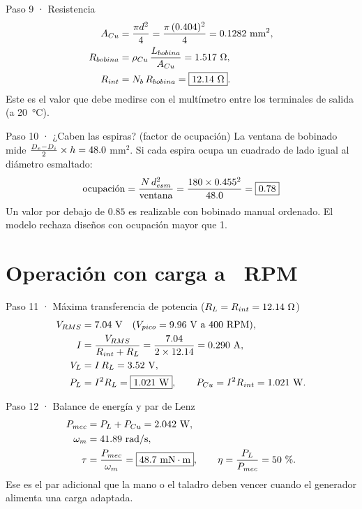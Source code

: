 \documentclass[11pt]{article}
\begin{document}
\begin{paso}{Paso 9 · Resistencia}
\begin{align*}
  A_{Cu}&=\frac{\pi d^2}{4}=\frac{\pi\,(0.404)^2}{4}=0.1282\ \text{mm}^2,\\
  R_{bobina}&=\rho_{Cu}\,\frac{L_{bobina}}{A_{Cu}}=1.517\ \Omega,\\
  R_{int}&=N_b\,R_{bobina}=\boxed{12.14\ \Omega}.
\end{align*}
Este es el valor que debe medirse con el multímetro entre los terminales de salida (a \SI{20}{\celsius}).
\end{paso}

\begin{paso}{Paso 10 · ¿Caben las espiras? (factor de ocupación)}
La ventana de bobinado mide $\frac{D_e-D_i}{2}\times h=48.0$ mm$^2$. Si cada espira ocupa un cuadrado de
lado igual al diámetro esmaltado:
\[
  \text{ocupación}=\frac{N\,d_{esm}^2}{\text{ventana}}=\frac{180\times0.455^2}{48.0}=\boxed{0.78}
\]
Un valor por debajo de $0.85$ es realizable con bobinado manual ordenado. El modelo rechaza diseños con
ocupación mayor que 1.
\end{paso}

\section{Operación con carga a \ValRpmCarga\ RPM}
\begin{paso}{Paso 11 · Máxima transferencia de potencia ($R_L=R_{int}=12.14\ \Omega$)}
\begin{align*}
  V_{RMS}&=7.04\ \text{V}\quad(V_{pico}=9.96\ \text{V a 400\ RPM}),\\
  I&=\frac{V_{RMS}}{R_{int}+R_L}=\frac{7.04}{2\times12.14}=0.290\ \text{A},\\
  V_{L}&=I\,R_L=3.52\ \text{V},\\
  P_L&=I^2R_L=\boxed{1.021\ \text{W}},\qquad P_{Cu}=I^2R_{int}=1.021\ \text{W}.
\end{align*}
\end{paso}

\begin{paso}{Paso 12 · Balance de energía y par de Lenz}
\begin{align*}
  P_{mec}&=P_L+P_{Cu}=2.042\ \text{W},\\
  \omega_m&=41.89\ \text{rad/s},\\
  \tau&=\frac{P_{mec}}{\omega_m}=\boxed{48.7\ \text{mN}\cdot\text{m}},\qquad
  \eta=\frac{P_L}{P_{mec}}=50\ \text{\%}.
\end{align*}
Ese es el par adicional que la mano o el taladro deben vencer cuando el generador alimenta una carga adaptada.
\end{paso}
\end{document}

